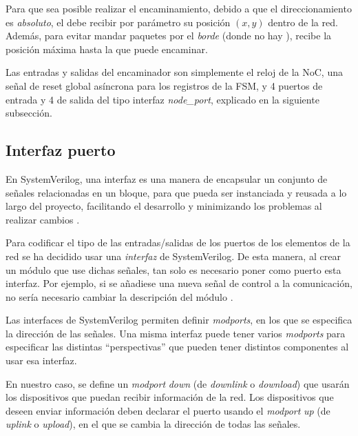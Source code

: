 Para que sea posible realizar el encaminamiento, debido a que el direccionamiento es \textit{absoluto}, el  debe recibir por parámetro su posición $(x,y)$ dentro de la red. Además, para evitar mandar paquetes por el \textit{borde} (donde no hay ), recibe la posición máxima hasta la que puede encaminar.

Las entradas y salidas del encaminador son simplemente el reloj de la NoC, una señal de reset global asíncrona para los registros de la FSM, y 4 puertos de entrada y 4 de salida del tipo interfaz \textit{node\_port}, explicado en la siguiente subsección.

\subsection{Interfaz puerto}

En SystemVerilog, una interfaz es una manera de encapsular un conjunto de señales relacionadas en un bloque, para que pueda ser instanciada y reusada a lo largo del proyecto, facilitando el desarrollo y minimizando los problemas al realizar cambios \cite{CVSVIface}.

Para codificar el tipo de las entradas/salidas de los puertos de los elementos de la red se ha decidido usar una \textit{interfaz} de SystemVerilog. De esta manera, al crear un módulo que use dichas señales, tan solo es necesario poner como puerto esta interfaz. Por ejemplo, si se añadiese una nueva señal de control a la comunicación, no sería necesario cambiar la descripción del módulo .

Las interfaces de SystemVerilog permiten definir \textit{modports}, en los que se especifica la dirección de las señales. Una misma interfaz puede tener varios \textit{modports} para especificar las distintas ``perspectivas'' que pueden tener distintos componentes al usar esa interfaz.

En nuestro caso, se define un \textit{modport} \textit{down} (de \textit{downlink} o \textit{download}) que usarán los dispositivos que puedan recibir información de la red. Los dispositivos que deseen enviar información deben declarar el puerto usando el \textit{modport} \textit{up} (de \textit{uplink} o \textit{upload}), en el que se cambia la dirección de todas las señales.

